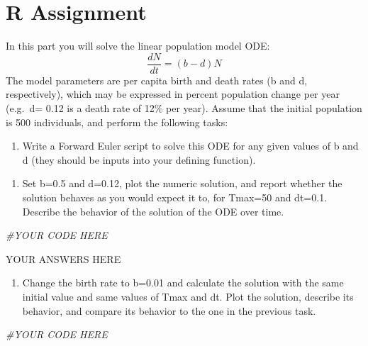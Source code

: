 \documentclass[
]{book}
\newenvironment{Shaded}{\begin{snugshade}}{\end{snugshade}}
\newcommand{\CommentTok}[1]{\textcolor[rgb]{0.56,0.35,0.01}{\textit{#1}}}
\providecommand{\tightlist}{%
  \setlength{\itemsep}{0pt}\setlength{\parskip}{0pt}}
\theoremstyle{definition}
\theoremstyle{definition}
\theoremstyle{definition}
\theoremstyle{remark}
\begin{document}
\hypertarget{r-assignment-5}{%
\section{R Assignment}\label{r-assignment-5}}

In this part you will solve the linear population model ODE:
\[ \frac{dN}{dt} = (b-d) N \]
The model parameters are per capita birth and death rates (b and d, respectively), which may be expressed in percent population change per year (e.g.~d= 0.12 is a death rate of 12\% per year). Assume that the initial population is 500 individuals, and perform the following tasks:

\begin{enumerate}
\def\labelenumi{\arabic{enumi}.}
\tightlist
\item
  Write a Forward Euler script to solve this ODE for any given values of b and d (they should be inputs into your defining function).
\end{enumerate}

\begin{enumerate}
\def\labelenumi{\alph{enumi})}
\tightlist
\item
  Set b=0.5 and d=0.12, plot the numeric solution, and report whether the solution behaves as you would expect it to, for Tmax=50 and dt=0.1. Describe the behavior of the solution of the ODE over time.
\end{enumerate}

\begin{Shaded}
\begin{Highlighting}[]
\CommentTok{\#YOUR CODE HERE}
\end{Highlighting}
\end{Shaded}

YOUR ANSWERS HERE

\begin{enumerate}
\def\labelenumi{\alph{enumi})}
\setcounter{enumi}{1}
\tightlist
\item
  Change the birth rate to b=0.01 and calculate the solution with the same initial value and same values of Tmax and dt. Plot the solution, describe its behavior, and compare its behavior to the one in the previous task.
\end{enumerate}

\begin{Shaded}
\begin{Highlighting}[]
\CommentTok{\#YOUR CODE HERE}
\end{Highlighting}
\end{Shaded}
\end{document}
